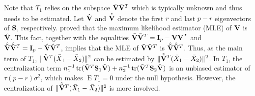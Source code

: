 \documentclass[review]{elsarticle}
\DeclareMathOperator{\mytr}{tr}
\DeclareMathOperator{\myE}{E}
\theoremstyle{plain}
\theoremstyle{definition}
\theoremstyle{remark}
\begin{document}
Note that $T_1$ %
relies on the subspace $\tilde{\mathbf{V}}\tilde{\mathbf{V}}^T$ which is typically unknown and thus needs to be estimated.
Let $\hat{\mathbf{V}}$ and $\hat{\tilde{\mathbf{V}}}$ denote the first $r$ and last $p-r$ eigenvectors of $\mathbf{S}$, respectively.
\cite{Anderson1986Asymptotic} proved that
the maximum likelihood estimator (MLE) of $\mathbf{V}$ is $\hat{\mathbf{V}}$.
This fact, together with the equalities $\tilde{\mathbf{V}}\tilde{\mathbf{V}}^T= \mathbf{I}_p-\mathbf{V}\mathbf{V}^T$ and $\hat{\tilde{\mathbf{V}}}\hat{\tilde{\mathbf{V}}}^T= \mathbf{I}_p-\hat{\mathbf{V}}\hat{\mathbf{V}}^T$, implies that 
the MLE of $\tilde{\mathbf{V}}\tilde{\mathbf{V}}^T$ is $\hat{\tilde{\mathbf{V}}}\hat{\tilde{\mathbf{V}}}^T$.
Thus, as the main term of $T_1$,
$\|\tilde{\mathbf{V}}^T (\bar{X}_1-\bar{X}_2)\|^2$ can be estimated by $\|\hat{\tilde{\mathbf{V}}}^T (\bar{X}_1-\bar{X}_2)\|^2$.
In $T_1$, the centralization term $n_1^{-1}\mytr(\tilde{\BV}^T \BS_1\tilde{\BV})+n_2^{-1}\mytr(\tilde{\BV}^T \BS_2\tilde{\BV})$ is an unbiased estimator of $\tau (p-r)\sigma^2$, 
which makes $\myE T_1=0$ under the null hypothesis.
However, the centralization of $\|\hat{\tilde{\mathbf{V}}}^T (\bar{X}_1-\bar{X}_2)\|^2$ is more involved.
\end{document}
